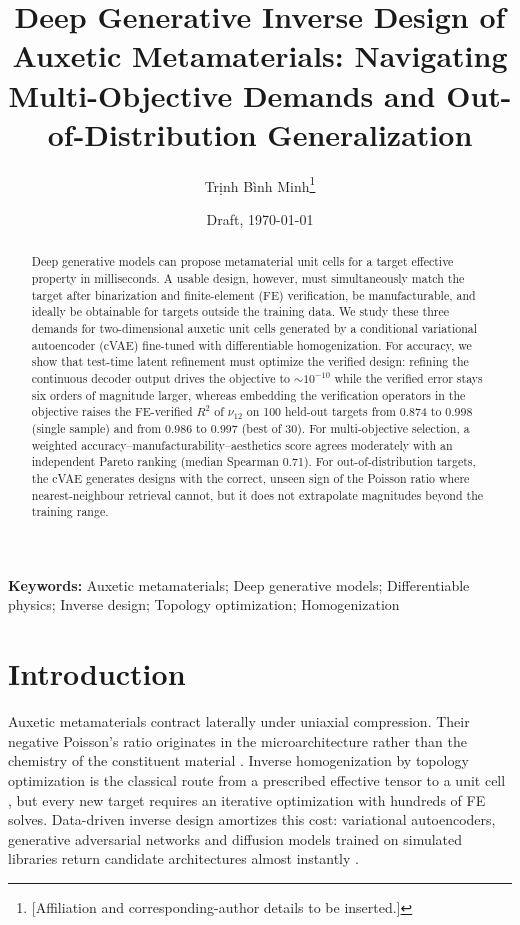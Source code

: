 \documentclass[a4paper,11pt]{article}
\title{Deep Generative Inverse Design of Auxetic Metamaterials: Navigating
Multi-Objective Demands and Out-of-Distribution Generalization}
\author{Trịnh Bình Minh\thanks{[Affiliation and corresponding-author details to be inserted.]}}
\date{Draft, \today}
\newcommand{\nuot}{\nu_{12}}
\newcommand{\RR}{R^2}
\begin{document}
\maketitle

\begin{abstract}
Deep generative models can propose metamaterial unit cells for a target
effective property in milliseconds. A usable design, however, must
simultaneously match the target after binarization and finite-element (FE)
verification, be manufacturable, and ideally be obtainable for targets outside
the training data. We study these three demands for two-dimensional auxetic
unit cells generated by a conditional variational autoencoder (cVAE)
fine-tuned with differentiable homogenization. For accuracy, we show that
test-time latent refinement must optimize the verified design: refining the
continuous decoder output drives the objective to $\sim\!10^{-10}$ while the
verified error stays six orders of magnitude larger, whereas embedding the
verification operators in the objective raises the FE-verified $\RR$ of
$\nuot$ on 100 held-out targets from 0.874 to 0.998 (single sample) and from
0.986 to 0.997 (best of 30). For multi-objective selection, a weighted
accuracy--manufacturability--aesthetics score agrees moderately with an
independent Pareto ranking (median Spearman 0.71). For out-of-distribution
targets, the cVAE generates designs with the correct, unseen sign of the
Poisson ratio where nearest-neighbour retrieval cannot, but it does not
extrapolate magnitudes beyond the training range.
\end{abstract}

\noindent\textbf{Keywords:} Auxetic metamaterials; Deep generative models;
Differentiable physics; Inverse design; Topology optimization; Homogenization

\section{Introduction}

Auxetic metamaterials contract laterally under uniaxial compression. Their
negative Poisson's ratio originates in the microarchitecture rather than the
chemistry of the constituent material
\citep{lakes1987foam,evans2000auxetic,bertoldi2017flexible}. Inverse
homogenization by topology optimization is the classical route from a
prescribed effective tensor to a unit cell
\citep{sigmund1994materials,larsen1997design,bendsoe2003topology}, but every
new target requires an iterative optimization with hundreds of FE solves.
Data-driven inverse design amortizes this cost: variational autoencoders,
generative adversarial networks and diffusion models trained on simulated
libraries return candidate architectures almost instantly
\citep{wang2020deep,mao2020gan,kumar2020spinodoid,bastek2022inverting,kollmann2020deep,zheng2021controllable,pahlavani2024deep,bastek2023diffusion}.
\end{document}
